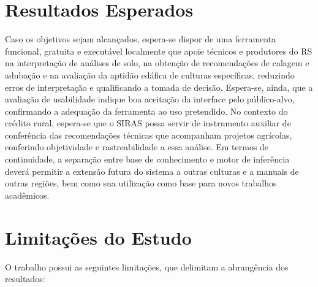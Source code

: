 \section{Resultados Esperados}\label{sec:resultados_esperados}

Caso os objetivos sejam alcançados, espera-se dispor de uma ferramenta
funcional, gratuita e executável localmente que apoie técnicos e
produtores do RS na interpretação de análises de solo, na obtenção de
recomendações de calagem e adubação e na avaliação da aptidão edáfica
de culturas específicas, reduzindo erros de interpretação e
qualificando a tomada de decisão. Espera-se, ainda, que a avaliação de
usabilidade indique boa aceitação da interface pelo público-alvo,
confirmando a adequação da ferramenta ao uso pretendido. No contexto do
crédito rural,
espera-se que o SIRAS possa servir de instrumento auxiliar de
conferência das recomendações técnicas que acompanham projetos
agrícolas, conferindo objetividade e rastreabilidade a essa análise.
Em termos de continuidade, a separação entre base de conhecimento e
motor de inferência deverá permitir a extensão futura do sistema a
outras culturas e a manuais de outras regiões, bem como sua utilização
como base para novos trabalhos acadêmicos.

\section{Limitações do Estudo}\label{sec:limitacoes}

O trabalho possui as seguintes limitações, que delimitam a abrangência
dos resultados:


